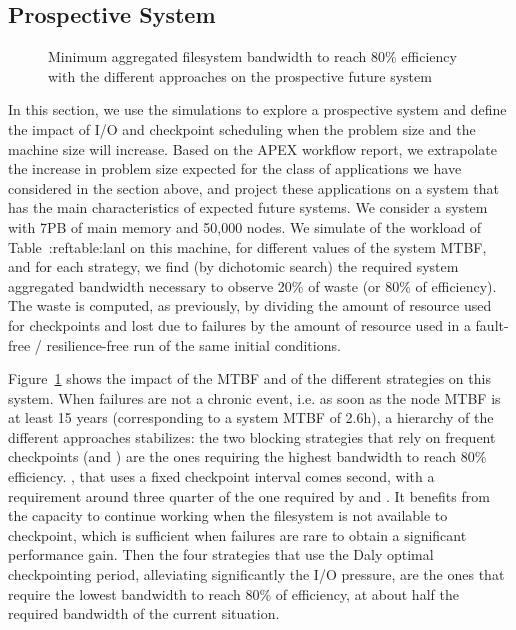 \subsection{Prospective System}

\begin{figure}
  \begin{center}
    \resizebox{\linewidth}{!}{}
  \end{center}
  \caption{Minimum aggregated filesystem bandwidth to reach 80\%
    efficiency with the different approaches on the prospective
    future system \label{fig:prosp}}
\end{figure}

In this section, we use the simulations to explore a prospective
system and define the impact of I/O and checkpoint scheduling when the
problem size and the machine size will increase. Based on the APEX
workflow report, we extrapolate the increase in problem size expected
for the class of applications we have considered in the section above,
and project these applications on a system that has the main
characteristics of expected future systems. We consider a system with
7PB of main memory and 50,000 nodes. We simulate of the workload of
Table~:ref{table:lanl} on this machine, for different values of the
system MTBF, and for each strategy, we find (by dichotomic search) the
required system aggregated bandwidth necessary to observe 20\% of
waste (or 80\% of efficiency). The waste is computed, as previously,
by dividing the amount of resource used for checkpoints and lost due
to failures by the amount of resource used in a fault-free /
resilience-free run of the same initial conditions.

Figure~\ref{fig:prosp} shows the impact of the MTBF and of the
different strategies on this system. When failures are not a chronic
event, i.e. as soon as the node MTBF is at least 15 years
(corresponding to a system MTBF of 2.6h), a hierarchy of the different
approaches stabilizes: the two blocking strategies that rely on
frequent checkpoints (\propfixed and \bfifofixed) are the ones
requiring the highest bandwidth to reach 80\%
efficiency. %
\fifofixed, that uses a fixed checkpoint interval comes second, with a
requirement around three quarter of the one required by \propfixed and
\fifofixed. It benefits from the capacity to continue working when the
filesystem is not available to checkpoint, which is sufficient when
failures are rare to obtain a significant performance
gain. %
Then the four strategies that use the Daly optimal checkpointing
period, alleviating significantly the I/O pressure, are the ones that
require the lowest bandwidth to reach 80\% of efficiency, at about
half the required bandwidth of the current
situation. %

